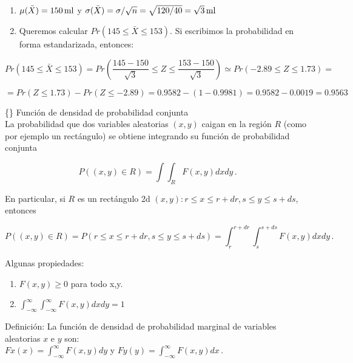 \documentclass[
]{agujournal2019}
\providecommand{\tightlist}{%
  \setlength{\itemsep}{0pt}\setlength{\parskip}{0pt}}\usepackage{longtable,booktabs,array}
\begin{document}
\begin{enumerate}
\def\labelenumi{(\alph{enumi})}
\tightlist
\item
  \(\mu(\bar{X})=150\,{\rm ml}\) y
  \(\sigma(\bar{X})=\sigma/\sqrt{n}=\sqrt{120/40}= \sqrt{3}\,{\rm ml}\)\\
\item
  Queremos calcular \(Pr(145 \le \bar{X} \le 153)\). Si escribimos la
  probabilidad en forma estandarizada, entonces:
\end{enumerate}

\[Pr(145 \le \bar{X} \le 153) =
      Pr\left( \frac{145-150}{\sqrt{3}} \le Z \le \frac{153-150}{\sqrt{3}}\right)
       \simeq Pr(-2.89 \le Z \le 1.73)=\]

\[=Pr(Z \le 1.73)- Pr(Z \le -2.89)=0.9582-(1-0.9981)=0.9582-0.0019=0.9563\]

\vspace{0.5cm}

\{\noindent\} Función de densidad de probabilidad conjunta\\

La probabilidad que dos variables aleatorias \((x,y)\) caigan en la
región \(R\) (como por ejemplo un rectángulo) se obtiene integrando su
función de probabilidad conjunta

\[P((x,y)\in R)=\int\int_{R} F(x,y) dx dy\,.\]

En particular, si \(R\) es un rectángulo 2d
\({(x,y):r\le x \le r+dr, s \le y \le s+ds}\), entonces

\[P((x,y)\in R)=P(r\le x \le r+dr, s \le y \le s+ds)=\int^{r+dr}_r\int^{s+ds}_{s} F(x,y) dx dy\,.\]

Algunas propiedades:\\

\begin{enumerate}
\def\labelenumi{(\arabic{enumi})}
\tightlist
\item
  \(F(x,y)\ge0\) para todo x,y.\\
\item
  \(\int^{\infty}_{-\infty}\int^{\infty}_{-\infty} F(x,y) dx dy=1\)\\
\end{enumerate}

Definición: La función de densidad de probabilidad marginal de variables
aleatorias \(x\) e \(y\) son:\\
\(Fx(x)=\int^{\infty}_{-\infty} F(x,y)dy\) y
\(Fy(y)=\int^{\infty}_{-\infty} F(x,y)dx\,.\)

\vspace{0.5cm}
\end{document}
